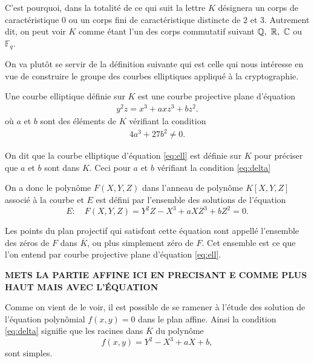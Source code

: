 C'est pourquoi, dans la totalité de ce qui suit la lettre $K$ désignera un corps de caractéristique $0$ ou un
corps fini de caractéristique distincte de $2$ et $3$. Autrement dit, on peut voir $K$
comme étant l'un des corps commutatif suivant $\mathbb{Q},\ \mathbb{R},\ \mathbb{C}$ ou $\mathbb{F}_{q}$.


On va plutôt se servir de la définition suivante qui est celle qui nous intéresse en
vue de construire le groupe des courbes elliptiques appliqué à la cryptographie.

\begin{definition}
    \label{def:ell}
    Une courbe elliptique définie sur $K$ est une courbe projective plane d'équation
    \begin{align}
        \label{eq:ell}
    y^2z=x^3+axz^3+bz^2
    .\end{align}
    où $a$ et $b$ sont des éléments de $K$ vérifiant la condition
    \begin{align}
        \label{eq:delta}
    4a^3+27b^2\neq 0
    .\end{align}
\end{definition}

On dit que la courbe elliptique d'équation \ref{eq:ell} est définie sur $K$ pour préciser
que $a$ et $b$ sont dans $K$. Ceci pour $a$ et $b$ vérifiant la condition
\eqref{eq:delta}  


On a donc le polynôme $F(X,Y,Z)$ dans l'anneau de polynôme $K[X,Y,Z]$ associé à la courbe et
$E$ est défini par l'ensemble des solutions de l'équation 
\[
E:\quad F(X,Y,Z) = Y^2Z-X^3+aXZ^3+bZ^2 = 0
.\] 

Les points du plan projectif qui satisfont cette équation sont appellé l'ensemble des zéros
de $F$ dans $\overline{K}$, ou plus simplement zéro de $F$. Cet ensemble est ce que l'on
entend par courbe projective plane d'équation \eqref{eq:ell}. 

\textbf{METS LA PARTIE AFFINE ICI EN PRECISANT E COMME PLUS HAUT MAIS AVEC L'ÉQUATION}

Comme on vient de le voir, il est possible de se ramener à l'étude
des solution de l'équation
polynômial $f(x,y) = 0$ dans le plan affine. Ainsi la condition \eqref{eq:delta}
signifie que les racines dans $\overline{K}$ du polynôme
\[
f(x,y) = Y^2 - X^3 + aX + b
,\] 
sont simples.


